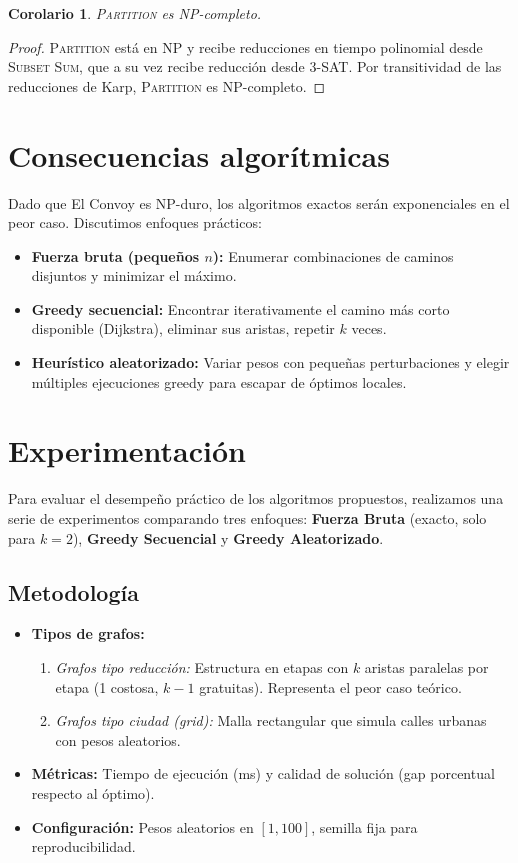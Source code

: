 \documentclass[11pt]{article}
\newtheorem{corollary}{Corolario}
\begin{document}
\begin{corollary}
\textsc{Partition} es NP-completo.
\end{corollary}
\begin{proof}
\textsc{Partition} está en NP y recibe reducciones en tiempo polinomial desde \textsc{Subset Sum}, que a su vez recibe reducción desde \textsc{3-SAT}. Por transitividad de las reducciones de Karp, \textsc{Partition} es NP-completo.
\end{proof}

\section{Consecuencias algorítmicas}
Dado que El Convoy es NP-duro, los algoritmos exactos serán exponenciales en el peor caso. Discutimos enfoques prácticos:
\begin{itemize}
  \item \textbf{Fuerza bruta (pequeños $n$):} Enumerar combinaciones de caminos disjuntos y minimizar el máximo.
  \item \textbf{Greedy secuencial:} Encontrar iterativamente el camino más corto disponible (Dijkstra), eliminar sus aristas, repetir $k$ veces.
  \item \textbf{Heurístico aleatorizado:} Variar pesos con pequeñas perturbaciones y elegir múltiples ejecuciones greedy para escapar de óptimos locales.
\end{itemize}

\section{Experimentación}

Para evaluar el desempeño práctico de los algoritmos propuestos, realizamos una serie de experimentos comparando tres enfoques: \textbf{Fuerza Bruta} (exacto, solo para $k=2$), \textbf{Greedy Secuencial} y \textbf{Greedy Aleatorizado}.

\subsection{Metodología}
\begin{itemize}
  \item \textbf{Tipos de grafos:} 
    \begin{enumerate}
      \item \emph{Grafos tipo reducción:} Estructura en etapas con $k$ aristas paralelas por etapa (1 costosa, $k-1$ gratuitas). Representa el peor caso teórico.
      \item \emph{Grafos tipo ciudad (grid):} Malla rectangular que simula calles urbanas con pesos aleatorios.
    \end{enumerate}
  \item \textbf{Métricas:} Tiempo de ejecución (ms) y calidad de solución (gap porcentual respecto al óptimo).
  \item \textbf{Configuración:} Pesos aleatorios en $[1, 100]$, semilla fija para reproducibilidad.
\end{itemize}
\end{document}
